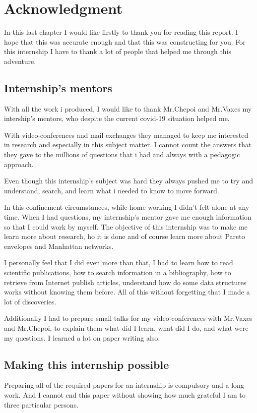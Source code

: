 \chapter{Acknowledgment}

In this last chapter I would like firstly to thank you for reading this report. I hope that this was accurate enough and that this was constructing for you. For this internship I have to thank a lot of people that helped me through this adventure.\newline

\section{Internship's mentors}
With all the work i produced, I would like to thank Mr.Chepoi and Mr.Vaxes my intership's mentors, who despite the current covid-19 situation helped me. 

With video-conferences and mail exchanges they managed to keep me interested in research and especially in this subject matter. I cannot count the answers that they gave to the millions of questions that i had and always with a pedagogic approach.

Even though this internship's subject was hard they always pushed me to try and understand, search, and learn what i needed to know to move forward.

In this confinement circumstances, while home working I didn't felt alone at any time. When I had questions, my internship's mentor gave me enough information so that I could work by myself. The objective of this internship was to make me learn more about research, ho it is done and of course learn more about Pareto envelopes and Manhattan networks.\newline


I personally feel that I did even more than that, I had to learn how to read scientific publications, how to search information in a bibliography, how to retrieve from Internet publish articles, understand how do some data structures works without knowing them before. All of this without forgetting that I made a lot of discoveries. 

Additionally I had to prepare small talks for my video-conferences with Mr.Vaxes and Mr.Chepoi, to explain them what did I learn, what did I do, and what were my questions. I learned a lot on paper writing also.

\section{Making this internship possible}
Preparing all of the required papers for an internship is compulsory and a long work. And I cannot end this paper without showing how much grateful I am to three particular persons.

